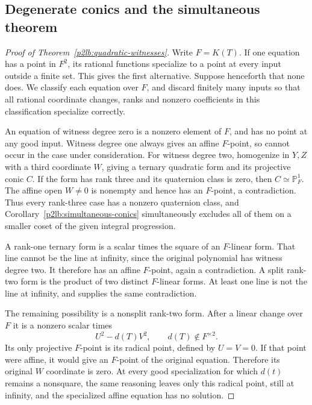 \documentclass[11pt]{article}
\theoremstyle{definition}
\begin{document}
\subsection{Degenerate conics and the simultaneous theorem}

\begin{proof}[Proof of Theorem~\ref{p2lb:quadratic-witnesses}]
Write $F=K(T)$.  If one equation has a point in $F^2$, its rational
functions specialize to a point at every input outside a finite set.
This gives the first alternative.  Suppose henceforth that none does.
We classify each equation over $F$, and discard finitely many inputs
so that all rational coordinate changes, ranks and nonzero coefficients
in this classification specialize correctly.

An equation of witness degree zero is a nonzero element of $F$, and
has no point at any good input.  Witness degree one always gives an
affine $F$-point, so cannot occur in the case under consideration.
For witness degree two, homogenize in $Y,Z$ with a third coordinate
$W$, giving a ternary quadratic form and its projective conic $C$.
If the form has rank three and its quaternion class is zero, then
$C\simeq\mathbb P^1_F$.  The affine open $W\ne0$ is nonempty
and hence has an $F$-point, a contradiction.  Thus every rank-three
case has a nonzero quaternion class, and
Corollary~\ref{p2lb:simultaneous-conics} simultaneously excludes all
of them on a smaller coset of the given integral progression.

A rank-one ternary form is a scalar times the square of an
$F$-linear form.  That line cannot be the line at infinity, since the
original polynomial has witness degree two.  It therefore has an
affine $F$-point, again a contradiction.  A split rank-two form is the
product of two distinct $F$-linear forms.  At least one line is not
the line at infinity, and supplies the same contradiction.

The remaining possibility is a nonsplit rank-two form.  After a linear
change over $F$ it is a nonzero scalar times
\[
                         U^2-d(T)V^2,
                         \qquad d(T)\notin F^{\times2}.
\]
Its only projective $F$-point is its radical point, defined by
$U=V=0$.  If that point were affine, it would give an $F$-point of
the original equation.  Therefore its original $W$ coordinate is
zero.  At every good specialization for which $d(t)$ remains a
nonsquare, the same reasoning leaves only this radical point, still
at infinity, and the specialized affine equation has no solution.


\end{proof}
\end{document}

